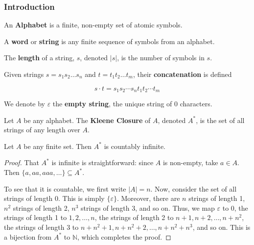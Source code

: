 \subsubsection{Introduction}\label{subsubsec:introduction}
\begin{definition}
 An \textbf{Alphabet} is a finite, non-empty set of atomic symbols.
\end{definition}

\begin{definition}
 A \textbf{word} or \textbf{string} is any finite sequence of symbols from an alphabet. 
\end{definition}

\begin{definition}
 The \textbf{length} of a string, \(s\), denoted \(|s|\), is the number of symbols in \(s\). 
\end{definition}

\begin{definition}
 Given strings \(s=s_1s_2\hdots s_n\) and \(t=t_1t_2\hdots t_m\), their \textbf{concatenation} is defined 
 
 \[s\cdot t=s_1s_2\cdots s_n t_1t_2\cdots t_m\]
\end{definition}

We denote by \(\varepsilon \) the \textbf{empty string}, the unique string of 0 characters. 

\begin{definition}
 Let \(A\) be any alphabet. The \textbf{Kleene Closure} of \(A\), denoted \(A^*\), is the set of all strings of any length over \(A\).  
\end{definition}

\begin{theorem}
 Let \(A\) be any finite set. Then \(A^*\) is countably infinite. 
\end{theorem}

\begin{proof}
 That \(A^*\) is infinite is straightforward: since \(A\) is non-empty, take \(a\in A\). Then \(\{a, aa, aaa, \hdots\}\subseteq A^*\).
 
 To see that it is countable, we first write \(|A|=n\). Now, consider the set of all strings of length 0. This is simply \(\{\varepsilon\}\). Moreover, there are \(n\) strings of length 1, \(n^2\) strings of length 2, \(n^3\) strings of length 3, and so on. Thus, we map \(\varepsilon\) to 0, the strings of length 1 to \(1, 2, \hdots, n\), the strings of length 2 to \(n+1, n+2, \hdots, n+n^2\), the strings of length 3 to \(n+n^2+1, n+n^2+2,\hdots, n+n^2+n^3\), and so on. This is a bijection from \(A^*\) to \(\mathbb{N}\), which completes the proof.
\end{proof}


